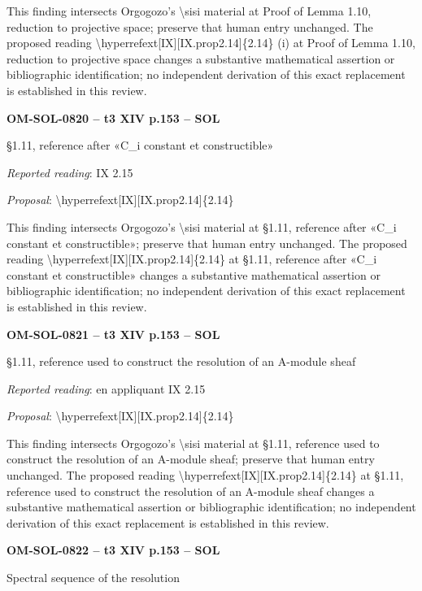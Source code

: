 This finding intersects Orgogozo's \textbackslash{}sisi material at Proof of Lemma 1.10, reduction to projective space; preserve that human entry unchanged. The proposed reading \textbackslash{}hyperrefext[IX][IX.prop2.14]\{2.14\} (i) at Proof of Lemma 1.10, reduction to projective space changes a substantive mathematical assertion or bibliographic identification; no independent derivation of this exact replacement is established in this review.\par
\par\noindent\textbf{OM-SOL-0820 -- t3 XIV p.153 -- SOL}\par
§1.11, reference after «C\_i constant et constructible»\par
\emph{Reported reading}: IX 2.15\par
\emph{Proposal}: \textbackslash{}hyperrefext[IX][IX.prop2.14]\{2.14\}\par
This finding intersects Orgogozo's \textbackslash{}sisi material at §1.11, reference after «C\_i constant et constructible»; preserve that human entry unchanged. The proposed reading \textbackslash{}hyperrefext[IX][IX.prop2.14]\{2.14\} at §1.11, reference after «C\_i constant et constructible» changes a substantive mathematical assertion or bibliographic identification; no independent derivation of this exact replacement is established in this review.\par
\par\noindent\textbf{OM-SOL-0821 -- t3 XIV p.153 -- SOL}\par
§1.11, reference used to construct the resolution of an A-module sheaf\par
\emph{Reported reading}: en appliquant IX 2.15\par
\emph{Proposal}: \textbackslash{}hyperrefext[IX][IX.prop2.14]\{2.14\}\par
This finding intersects Orgogozo's \textbackslash{}sisi material at §1.11, reference used to construct the resolution of an A-module sheaf; preserve that human entry unchanged. The proposed reading \textbackslash{}hyperrefext[IX][IX.prop2.14]\{2.14\} at §1.11, reference used to construct the resolution of an A-module sheaf changes a substantive mathematical assertion or bibliographic identification; no independent derivation of this exact replacement is established in this review.\par
\par\noindent\textbf{OM-SOL-0822 -- t3 XIV p.153 -- SOL}\par
Spectral sequence of the resolution\par
